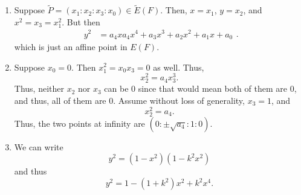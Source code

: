 \documentclass[12 pt, letterpaper]{hmcpset}
\begin{document}
\begin{solution}
	\begin{enumerate}
		\item Suppose $\tilde{P} = (x_{1} : x_{2} : x_{3} : x_{0}) \in \tilde{E}(F)$. Then, $x = x_{1}$, $y = x_{2}$, and $x^{2} = x_{3} = x_{1}^{2}$. But then
			\[
				\begin{split}
					y^{2} & = a_{4} x a_{4} x^{4} + a_{3} x^{3} + a_{2} x^{2} + a_{1} x + a_{0}
				\end{split}.
			\]
			which is just an affine point in $E(F)$.
		\item Suppose $x_{0} = 0$. Then $x_{1}^{2} = x_{0} x_{3} = 0$ as well. Thus,
			\[
				x_{2}^{2} = a_{4} x_{3}^{3}.
			\]
			Thus, neither $x_{2}$ nor $x_{3}$ can be $0$ since that would mean both of them are $0$, and thus, all of them are $0$. Assume without loss of generality, $x_{3} = 1$, and
			\[
				x_{2}^{2} = a_{4}.
			\]
			Thus, the two points at infinity are $(0 : \pm \sqrt{a_{4}} : 1 : 0)$.
		\item We can write
			\[
				y^{2} = (1 - x^{2})(1 - k^{2} x^{2})
			\]
			and thus
			\[
				y^{2} = 1 - (1 + k^{2}) x^{2} + k^{2} x^{4}.
			\]


\end{enumerate}
\end{solution}
\end{document}
